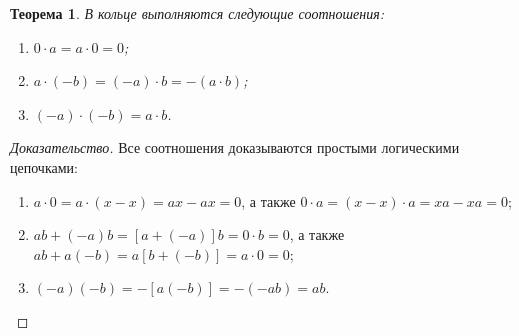 \documentclass{article}
\newtheorem*{theorem*}{Теорема}
\theoremstyle{plain}
\theoremstyle{definition}
\begin{document}
\begin{theorem*}
	В кольце выполняются следующие соотношения:

	\begin{enumerate}
		\item \(0 \cdot a = a \cdot 0 = 0\);
		\item \(a \cdot (-b) = (-a) \cdot b = -(a \cdot b)\);
		\item \((-a) \cdot (-b) = a \cdot b\).
	\end{enumerate}
\end{theorem*}

\begin{proof}[Доказательство]
	Все соотношения доказываются простыми логическими цепочками:

	\begin{enumerate}
		\item \(a \cdot 0 = a \cdot (x - x) = ax - ax = 0\), а также \(0 \cdot a = (x - x) \cdot a = xa - xa = 0\); 
		\item \(ab + (-a)b = [a + (-a)]b = 0 \cdot b = 0\), а также \(ab + a(-b) = a[b + (-b)] = a \cdot 0 = 0\);
		\item \((-a)(-b) = -[a(-b)] = -(-ab) = ab\).
	\end{enumerate}
\end{proof}
\end{document}
